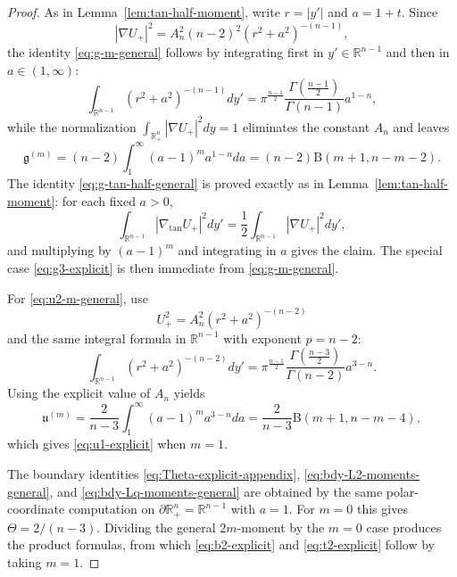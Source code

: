\documentclass[11pt,reqno,a4paper]{amsart}
\newcommand{\R}{\mathbb{R}}
\numberwithin{equation}{section}
\theoremstyle{plain}
\theoremstyle{remark}
\theoremstyle{plain}
\begin{document}
\begin{proof}
As in Lemma~\ref{lem:tan-half-moment}, write $r=|y'|$ and $a=1+t$. Since
\[
|\nabla U_+|^2=A_n^2(n-2)^2(r^2+a^2)^{-(n-1)},
\]
the identity \eqref{eq:g-m-general} follows by integrating first in $y'\in\R^{n-1}$ and then in $a\in(1,\infty)$:
\[
\int_{\R^{n-1}}(r^2+a^2)^{-(n-1)}dy'
=\pi^{\frac{n-1}{2}}\frac{\Gamma(\frac{n-1}{2})}{\Gamma(n-1)}a^{1-n},
\]
while the normalization $\int_{\R^n_+}|\nabla U_+|^2dy=1$ eliminates the constant $A_n$ and leaves
\[
\mathfrak g^{(m)}=(n-2)\int_1^\infty (a-1)^m a^{1-n}da=(n-2)\mathrm B(m+1,n-m-2).
\]
The identity \eqref{eq:g-tan-half-general} is proved exactly as in Lemma~\ref{lem:tan-half-moment}: for each fixed $a>0$,
\[
\int_{\R^{n-1}}|\nabla_{\tan}U_+|^2dy'=\frac12\int_{\R^{n-1}}|\nabla U_+|^2dy',
\]
and multiplying by $(a-1)^m$ and integrating in $a$ gives the claim. The special case \eqref{eq:g3-explicit} is then immediate from \eqref{eq:g-m-general}.

For \eqref{eq:u2-m-general}, use
\[
U_+^2=A_n^2(r^2+a^2)^{-(n-2)}
\]
and the same integral formula in $\R^{n-1}$ with exponent $p=n-2$:
\[
\int_{\R^{n-1}}(r^2+a^2)^{-(n-2)}dy'
=\pi^{\frac{n-1}{2}}\frac{\Gamma(\frac{n-3}{2})}{\Gamma(n-2)}a^{3-n}.
\]
Using the explicit value of $A_n$ yields
\[
\mathfrak u^{(m)}=\frac{2}{n-3}\int_1^\infty (a-1)^m a^{3-n}da
=\frac{2}{n-3}\mathrm B(m+1,n-m-4),
\]
which gives \eqref{eq:u1-explicit} when $m=1$.

The boundary identities \eqref{eq:Theta-explicit-appendix}, \eqref{eq:bdy-L2-moments-general}, and \eqref{eq:bdy-Lq-moments-general} are obtained by the same polar-coordinate computation on $\partial\R^n_+=\R^{n-1}$ with $a=1$. For $m=0$ this gives $\Theta=2/(n-3)$. Dividing the general $2m$-moment by the $m=0$ case produces the product formulas, from which \eqref{eq:b2-explicit} and \eqref{eq:t2-explicit} follow by taking $m=1$.
\end{proof}
\end{document}
